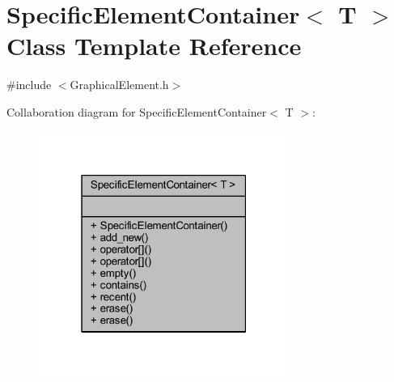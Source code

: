 \hypertarget{class_specific_element_container}{}\section{Specific\+Element\+Container$<$ T $>$ Class Template Reference}
\label{class_specific_element_container}


{\ttfamily \#include $<$Graphical\+Element.\+h$>$}



Collaboration diagram for Specific\+Element\+Container$<$ T $>$\+:\nopagebreak
\begin{figure}[H]
\begin{center}
\leavevmode
\includegraphics[width=232pt]{class_specific_element_container__coll__graph}
\end{center}
\end{figure}
